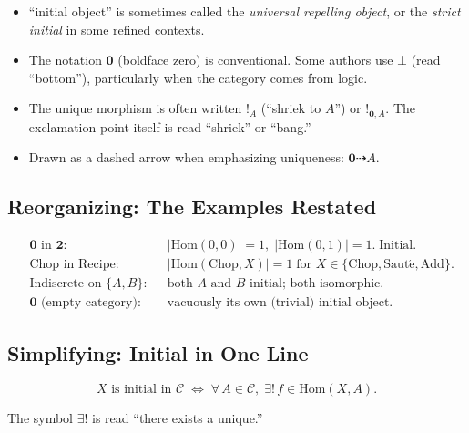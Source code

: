 \begin{howtosay}
\begin{itemize}
  \item ``initial object'' is sometimes called the \emph{universal repelling
        object}, or the \emph{strict initial} in some refined contexts.
  \item The notation $\mathbf{0}$ (boldface zero) is conventional. Some
        authors use $\bot$ (read ``bottom''), particularly when the category
        comes from logic.
  \item The unique morphism is often written $!_A$ (``shriek to $A$'') or
        $!_{\mathbf{0}, A}$. The exclamation point itself is read
        ``shriek'' or ``bang.''
  \item Drawn as a dashed arrow when emphasizing uniqueness:
        $\mathbf{0} \dashrightarrow A$.
\end{itemize}
\end{howtosay}

\subsection{Reorganizing: The Examples Restated}

\begin{align*}
  &\text{$\mathbf{0}$ in $\mathbf{2}$:}
    && |\mathrm{Hom}(0, 0)| = 1,\; |\mathrm{Hom}(0, 1)| = 1. \;\text{Initial.} \\
  &\text{Chop in Recipe:}
    && |\mathrm{Hom}(\mathrm{Chop}, X)| = 1 \;\text{for } X \in \{\mathrm{Chop}, \mathrm{Saut\acute{e}}, \mathrm{Add}\}. \\
  &\text{Indiscrete on $\{A, B\}$:}
    && \text{both $A$ and $B$ initial; both isomorphic.} \\
  &\text{$\mathbf{0}$ (empty category):}
    && \text{vacuously its own (trivial) initial object.}
\end{align*}

\subsection{Simplifying: Initial in One Line}

\begin{equation*}
  X \text{ is initial in } \mathcal{C}
  \;\iff\;
  \forall\, A \in \mathcal{C},\; \exists !\, f \in \mathrm{Hom}(X, A).
\end{equation*}

The symbol $\exists !$ is read ``there exists a unique.''

